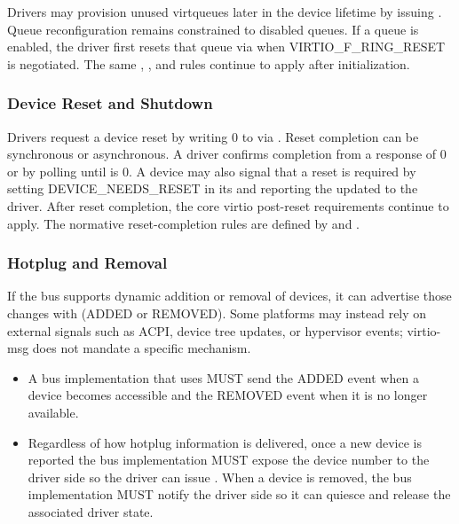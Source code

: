 Drivers may provision unused virtqueues later in the device lifetime by issuing
. Queue reconfiguration remains constrained to disabled
queues. If a queue is enabled, the driver first resets that queue via
 when VIRTIO\_F\_RING\_RESET is negotiated. The same
, , and  rules
continue to apply after initialization.

\subsubsection{Device Reset and Shutdown}
\label{sec:Virtio Transport Options / Virtio Over Messages / Device Operation / Reset}

Drivers request a device reset by writing 0 to  via
. Reset completion can be synchronous or
asynchronous. A driver confirms completion from a
 response  of 0 or by polling
 until  is 0. A device may also signal
that a reset is required by setting DEVICE\_NEEDS\_RESET in its
 and reporting the updated  to the driver. After
reset completion, the core virtio post-reset requirements continue to apply.
The normative reset-completion rules are defined by
 and .

\subsubsection{Hotplug and Removal}
\label{sec:Virtio Transport Options / Virtio Over Messages / Device Operation / Hotplug and Removal}

If the bus supports dynamic addition or removal of devices, it can advertise
those changes with  (ADDED or REMOVED). Some platforms may
instead rely on external signals such as ACPI, device tree updates, or
hypervisor events; virtio-msg does not mandate a specific mechanism.

\begin{itemize}
  \item A bus implementation that uses  MUST send the ADDED
        event when a device becomes accessible and the REMOVED event when it is
        no longer available.
  \item Regardless of how hotplug information is delivered, once a new device is
        reported the bus implementation MUST expose the device number to the
        driver side so the driver can issue . When a
        device is removed, the bus implementation MUST notify the driver side
        so it can quiesce and release the associated driver state.
\end{itemize}


